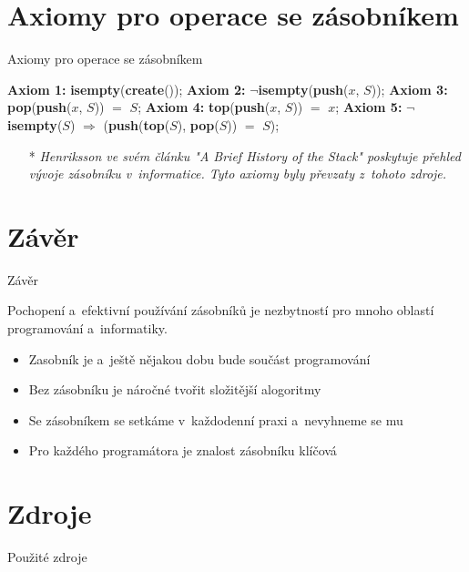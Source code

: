 \documentclass{beamer}
\begin{document}
\section{Axiomy pro operace se zásobníkem}
\begin{frame}{Axiomy pro operace se zásobníkem}

  \begin{algorithm}[H]
\caption{Axiomy pro operace se zásobníkem}
\begin{algorithmic}[1]
    \STATE \textbf{Axiom 1:} \textbf{isempty}(\textbf{create}());
    \STATE \textbf{Axiom 2:} $\neg$\textbf{isempty}(\textbf{push}($x$, $S$));
    \STATE \textbf{Axiom 3:} \textbf{pop}(\textbf{push}($x$, $S$)) $=$ $S$;
    \STATE \textbf{Axiom 4:} \textbf{top}(\textbf{push}($x$, $S$)) $=$ $x$;
    \STATE \textbf{Axiom 5:} $\neg$\textbf{isempty}($S$) $\Rightarrow$ (\textbf{push}(\textbf{top}($S$), \textbf{pop}($S$)) $=$ $S$);
\end{algorithmic}
\end{algorithm}

\begin{itemize}
\item[*] \emph{Henriksson ve svém článku "A Brief History of the Stack" poskytuje přehled vývoje zásobníku v~informatice. Tyto axiomy byly převzaty z~tohoto zdroje.}\cite{henriksson_stack_history}
\end{itemize}
\end{frame}


\section{Závěr}
\begin{frame}{Závěr}
  \begin{block}
  
  Pochopení a~efektivní používání zásobníků je nezbytností pro mnoho oblastí programování a~informatiky.\cite{shukla_stack}
  \end{block}
  
  \begin{itemize}
      \item Zasobník je a~ještě nějakou dobu bude součást programování
      \item Bez zásobníku je náročné tvořit složitější alogoritmy
      \item Se zásobníkem se setkáme v~každodenní praxi a~nevyhneme se mu 
      \item Pro každého programátora je znalost zásobníku klíčová
  \end{itemize}
\end{frame}




\section{Zdroje}
\begin{frame}{Použité zdroje}
	
	\renewcommand{\refname}{Použité zdroje:}
	
\end{frame}
\end{document}
